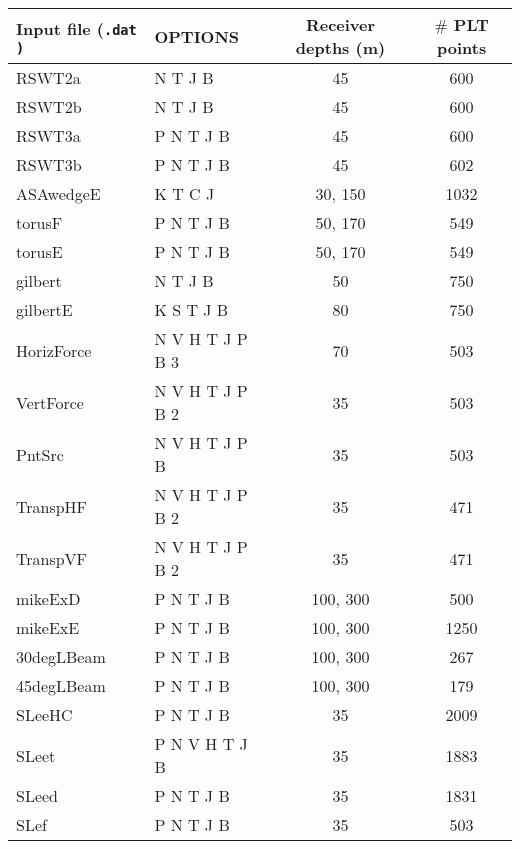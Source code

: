 \begin{table}
\begin{center}
\small
\begin{tabular}{|l|l|c|c|}
\hline \hline
{\bf Input file (\tt .dat \rm) }& {\bf OPTIONS} & {\bf Receiver depths
(m)}&{\bf  $\#$ PLT points }\\ \hline \hline
 RSWT2a           & N T J B         & 45       &   600  \\  \hline
 RSWT2b           & N T J B         & 45       &   600  \\  \hline
 RSWT3a           & P N T J B       & 45       &   600  \\  \hline
 RSWT3b           & P N T J B       & 45       &   602  \\  \hline
 ASAwedgeE        & K T C J         & 30, 150  &   1032 \\  \hline
 torusF           & P N T J B       & 50, 170  &   549  \\  \hline
 torusE           & P N T J B       & 50, 170  &   549  \\  \hline
 gilbert   	  & N T J B         & 50       &   750  \\  \hline
 gilbertE  	  & K S T J B       & 80       &   750  \\  \hline
 HorizForce  	  & N V H T J P B 3 & 70       &   503  \\  \hline
 VertForce  	  & N V H T J P B 2 & 35       &   503  \\  \hline
 PntSrc  	  & N V H T J P B   & 35       &   503  \\  \hline
 TranspHF 	  & N V H T J P B 2 & 35       &   471  \\  \hline
 TranspVF 	  & N V H T J P B 2 & 35       &   471  \\  \hline
 mikeExD   	  & P N T J B 	    & 100, 300 &   500  \\  \hline
 mikeExE   	  & P N T J B 	    & 100, 300 &   1250 \\  \hline
 30degLBeam       & P N T J B 	    & 100, 300 &   267  \\  \hline
 45degLBeam       & P N T J B 	    & 100, 300 &   179  \\  \hline
 SLeeHC           & P N T J B	    & 35       &   2009 \\  \hline
 SLeet            & P N V H T J B   & 35       &   1883 \\  \hline
 SLeed            & P N T J B       & 35       &   1831 \\  \hline
 SLef      	  & P N T J B       & 35       &   503  \\  \hline

\end{tabular}
\end{center}
\end{table}
